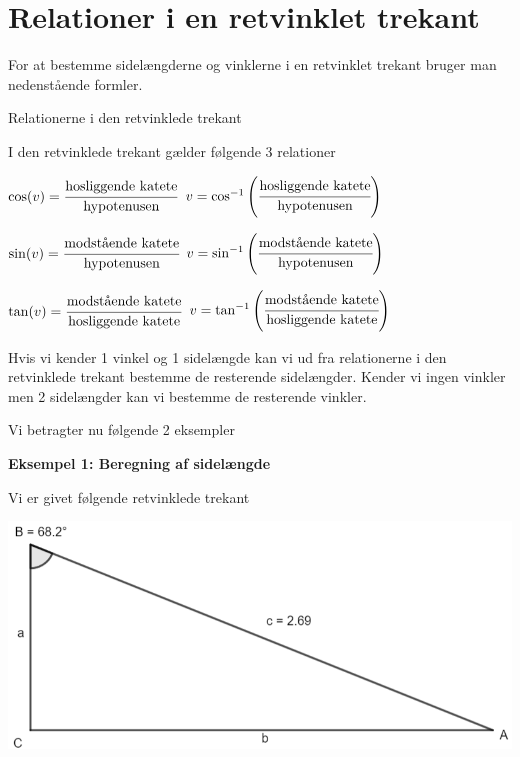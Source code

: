 \section*{Relationer i en retvinklet trekant}

For at bestemme sidelængderne og vinklerne i en retvinklet trekant bruger man nedenstående formler.

\begin{frm-thm}{Relationerne i den retvinklede trekant}

I den retvinklede trekant gælder følgende 3 relationer

$\cos(v) = \cfrac{\text{hosliggende katete}}{\text{hypotenusen}}$ \hspace*{2cm} $v = \cos^{-1}\left(\cfrac{\text{hosliggende katete}}{\text{hypotenusen}}\right)$

$\sin(v) = \cfrac{\text{modstående katete}}{\text{hypotenusen}}$ \hspace*{2cm} $v = \sin^{-1}\left(\cfrac{\text{modstående katete}}{\text{hypotenusen}}\right)$

$\tan(v) = \cfrac{\text{modstående katete}}{\text{hosliggende katete}}$ \hspace*{2cm} $v = \tan^{-1}\left(\cfrac{\text{modstående katete}}{\text{hosliggende katete}}\right)$

\end{frm-thm}

Hvis vi kender 1 vinkel og 1 sidelængde kan vi ud fra relationerne i den retvinklede trekant bestemme de resterende sidelængder. Kender vi ingen vinkler men 2 sidelængder kan vi bestemme de resterende vinkler.

Vi betragter nu følgende 2 eksempler

\textbf{Eksempel 1: Beregning af sidelængde}

Vi er givet følgende retvinklede trekant

\includegraphics[scale=0.7]{img_1}

